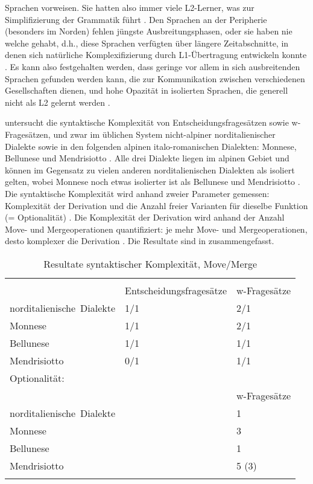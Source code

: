 Sprachen vorweisen. Sie hatten also immer viele L2-Ler\-ner, was zur Simplifizierung der Grammatik führt \citep[118--119]{Nichols2016}. Den Sprachen an der Peripherie (besonders im Norden) fehlen jüngste Ausbreitungsphasen, oder sie haben nie welche gehabt, d.h., diese Sprachen verfügten über längere Zeitabschnitte, in denen sich natürliche Komplexifizierung durch L1-Ü\-ber\-tra\-gung entwickeln konnte \citep[118--119]{Nichols2016}. Es kann also festgehalten werden, dass geringe  vor allem in sich ausbreitenden Sprachen gefunden werden kann, die zur Kommunikation zwischen verschiedenen Gesellschaften dienen, und hohe Opazität in isolierten Sprachen, die generell nicht als L2 gelernt werden \citep[132--133]{Nichols2016}.

\citet{Garzonio2016} untersucht die syntaktische Komplexität von Entscheidungsfragesätzen sowie w-Fragesätzen, und zwar im üblichen System nicht-alpiner norditalienischer Dialekte sowie in den folgenden alpinen ita\-lo-ro\-ma\-ni\-schen Dialekten: Monnese, Bellunese und Mendrisiotto \citep[95]{Garzonio2016}. Alle drei Dialekte liegen im alpinen Gebiet und können im Gegensatz zu vielen anderen norditalienischen Dialekten als isoliert gelten, wobei Monnese noch etwas isolierter ist als Bellunese und Mendrisiotto \citep[95, 102]{Garzonio2016}. Die syntaktische Komplexität wird anhand zweier Parameter gemessen: Komplexität der Derivation und die Anzahl freier Varianten für dieselbe Funktion (= Optionalität) \citep[98--99]{Garzonio2016}. Die Komplexität der Derivation wird anhand der Anzahl Move- und Mergeoperationen quantifiziert: je mehr Move- und Mergeoperationen, desto komplexer die Derivation \citep[98--99]{Garzonio2016}. Die Resultate sind in  zusammengefasst.


\begin{table}
\caption{Resultate syntaktischer Komplexität, Move/Merge \citep[111--112]{Garzonio2016} }\label{table2.1}
\begin{tabular}{lll}
\lsptoprule
\multicolumn{3}{l}{\mbox{Komplexität der Derivation:}}\\
 & Entscheidungsfragesätze & w-Fragesätze \\\midrule
\mbox{norditalienische Dialekte} & 1/1 & 2/1 \\
Monnese & 1/1 & 2/1 \\
Bellunese & 1/1 & 1/1 \\
Mendrisiotto & 0/1 & 1/1 \\
\midrule
\multicolumn{3}{l}{Optionalität:}\\
 & & w-Fragesätze   \\\midrule
\mbox{norditalienische Dialekte} & & 1  \\
Monnese & & 3  \\
Bellunese & & 1   \\
Mendrisiotto & & 5 (3)   \\
\lspbottomrule
\end{tabular}
\end{table}


